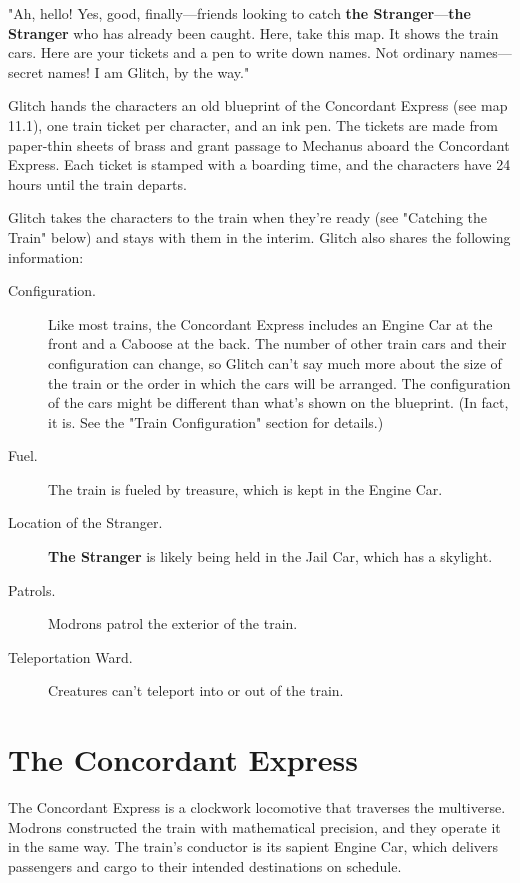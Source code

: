 \documentclass[10pt,a4paper,twoside,bg=print,twocolumn,openany,nodeprecatedcode]{dndbook}
\begin{document}
\begin{DndReadAloud}{}
"Ah, hello! Yes, good, finally—friends looking to catch \textbf{the Stranger}—\textbf{the Stranger} who has already been caught. Here, take this map. It shows the train cars. Here are your tickets and a pen to write down names. Not ordinary names—secret names! I am Glitch, by the way."

\end{DndReadAloud}

Glitch hands the characters an old blueprint of the Concordant Express (see map 11.1), one train ticket per character, and an ink pen. The tickets are made from paper-thin sheets of brass and grant passage to Mechanus aboard the Concordant Express. Each ticket is stamped with a boarding time, and the characters have 24 hours until the train departs.

Glitch takes the characters to the train when they're ready (see "Catching the Train" below) and stays with them in the interim. Glitch also shares the following information:


\begin{description}
\item[Configuration.]
Like most trains, the Concordant Express includes an Engine Car at the front and a Caboose at the back. The number of other train cars and their configuration can change, so Glitch can't say much more about the size of the train or the order in which the cars will be arranged. The configuration of the cars might be different than what's shown on the blueprint. (In fact, it is. See the "Train Configuration" section for details.)
\item[Fuel.]
The train is fueled by treasure, which is kept in the Engine Car.
\item[Location of the Stranger.]
\textbf{The Stranger} is likely being held in the Jail Car, which has a skylight.
\item[Patrols.]
Modrons patrol the exterior of the train.
\item[Teleportation Ward.]
Creatures can't teleport into or out of the train.
\end{description}

\section{The Concordant Express}
The Concordant Express is a clockwork locomotive that traverses the multiverse. Modrons constructed the train with mathematical precision, and they operate it in the same way. The train's conductor is its sapient Engine Car, which delivers passengers and cargo to their intended destinations on schedule.
\end{document}
